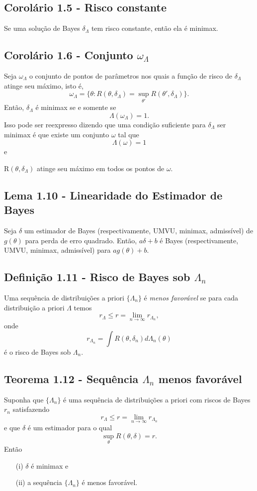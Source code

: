 \subsection{Corolário 1.5 - Risco constante}
Se uma solução de Bayes $\delta_{\Lambda}$ tem risco constante, então ela é minimax.

\subsection{Corolário 1.6 - Conjunto \texorpdfstring{\(\omega_\Lambda\)}{undefined}} 
Seja $\omega_{\Lambda}$ o conjunto de pontos de parâmetros nos quais a função de risco de $\delta_{\Lambda}$ atinge seu máximo, isto é,
\[
\omega_{\Lambda} = \{\theta : R(\theta, \delta_{\Lambda}) = \sup_{\theta'} R(\theta', \delta_{\Lambda})\}.
\]
Então, $\delta_{\Lambda}$ é minimax se e somente se
\[
\Lambda(\omega_{\Lambda}) = 1.
\]
Isso pode ser reexpresso dizendo que uma condição suficiente para $\delta_{\Lambda}$ ser minimax é que existe um conjunto $\omega$ tal que
\[
\Lambda(\omega) = 1
\]
e

R\((\theta, \delta_{\Lambda})\) atinge seu máximo em todos os pontos de $\omega$.

\subsection{Lema 1.10 - Linearidade do Estimador de Bayes}
Seja $\delta$ um estimador de Bayes (respectivamente, UMVU, minimax, admissível) de $g(\theta)$ para perda de erro quadrado. Então, $a\delta + b$ é Bayes (respectivamente, UMVU, minimax, admissível) para $ag(\theta) + b$.

\subsection{Definição 1.11 - Risco de Bayes sob \texorpdfstring{\(\Lambda_n\)}{undefined} } 
Uma sequência de distribuições a priori $\{\Lambda_n\}$ é \textit{menos favorável} se para cada distribuição a priori $\Lambda$ temos
\[
r_{\Lambda} \leq r = \lim_{n \to \infty} r_{\Lambda_n},
\]
onde
\[
r_{\Lambda_n} = \int R(\theta, \delta_n) d\Lambda_n(\theta)
\]
é o risco de Bayes sob $\Lambda_n$.

\subsection{Teorema 1.12 - Sequência \texorpdfstring{\(\Lambda_n\)}{undefined} menos favorável} Suponha que $\{\Lambda_n\}$ é uma sequência de distribuições a priori com riscos de Bayes $r_n$ satisfazendo
\[
r_{\Lambda} \leq r = \lim_{n \to \infty} r_{\Lambda_n}
\]
e que $\delta$ é um estimador para o qual
\[
\sup_{\theta} R(\theta, \delta) = r.
\]
Então
\begin{itemize}
\item[(i)] $\delta$ é minimax e
\item[(ii)] a sequência $\{\Lambda_n\}$ é menos favorável.
\end{itemize}

